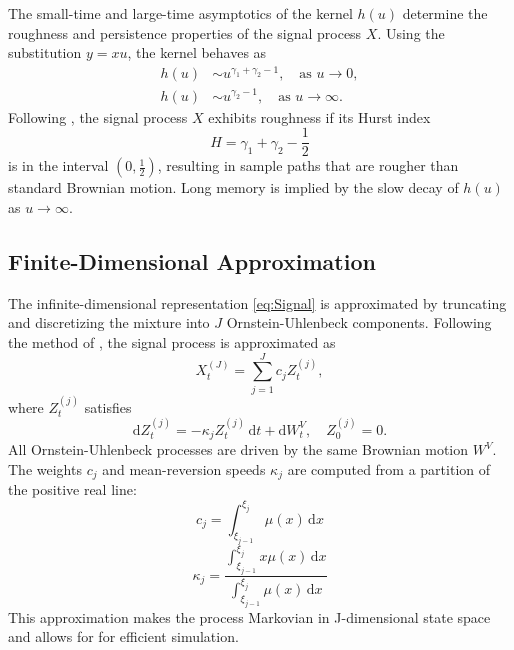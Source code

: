 The small-time and large-time asymptotics of the kernel $h(u)$ determine the roughness and persistence properties of the signal process $X$. Using the substitution $y = xu$, the kernel behaves as
\begin{align} \label{eq:KernelAsyptotics}
    h(u) &\sim u^{\gamma_1 + \gamma_2 - 1}, \quad \text{as } u \to 0,\\
    h(u) &\sim u^{\gamma_2 - 1}, \quad \text{as } u \to \infty.
\end{align}
Following \citet{BennedsenLundePakkanen2021}, the signal process $X$ exhibits roughness if its Hurst index
\begin{equation} \label{eq:HurstIndex}
    H = \gamma_1 + \gamma_2 - \frac{1}{2}
\end{equation}
is in the interval $\left(0,\frac{1}{2}\right)$, resulting in sample paths that are rougher than standard Brownian motion. Long memory is implied by the slow decay of $h(u)$ as $u \to \infty$.


\subsection{Finite-Dimensional Approximation} \label{subsec: Finite-Dimensional Approximation}

The infinite-dimensional representation \eqref{eq:Signal} is approximated by truncating and discretizing the mixture into $J$ Ornstein-Uhlenbeck components. Following the method of \citet{CarmonaCoutingMontseny2000}, the signal process is approximated as
\begin{equation} \label{eq:FiniteApprox}
    X_t^{(J)} = \sum_{j=1}^J c_j Z_t^{(j)},
\end{equation}
where $Z_t^{(j)}$ satisfies
\begin{equation}
    \mathrm{d} Z_t^{(j)} = -\kappa_j Z_t^{(j)} \,\mathrm{d}t + \mathrm{d}W_t^V,\quad Z_0^{(j)} = 0.
\end{equation}
All Ornstein-Uhlenbeck processes are driven by the same Brownian motion $W^V$. The weights $c_j$ and mean-reversion speeds $\kappa_j$ are computed from a partition of the positive real line:
\begin{equation} \label{eq:OUWeights}
    c_j = \int_{\xi_{j-1}}^{\xi_j} \mu(x) \, \mathrm{d}x
\end{equation}
\begin{equation} \label{eq:OUSpeeds}
    \kappa_j = \frac{\int_{\xi_{j-1}}^{\xi_j} x \mu(x) \, \mathrm{d}x}{\int_{\xi_{j-1}}^{\xi_j} \mu(x) \, \mathrm{d}x}
\end{equation}
This approximation makes the process Markovian in J-dimensional state space and allows for for efficient simulation.

